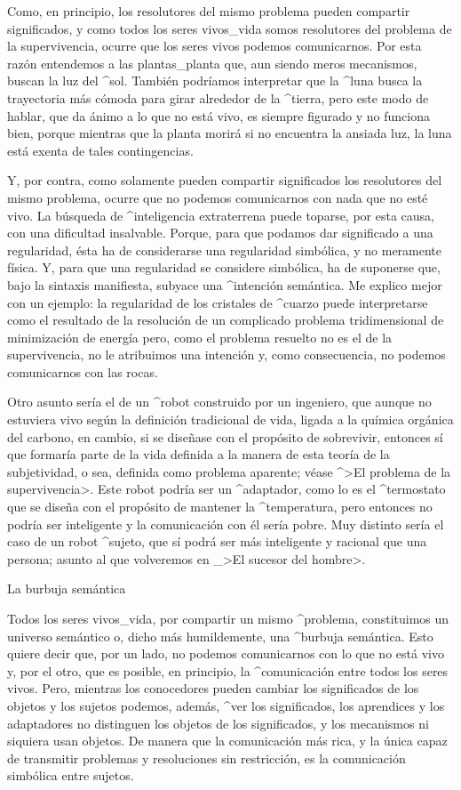 Como, en principio, los resolutores del mismo problema pueden compartir
significados, y como todos los seres vivos_{vida} somos resolutores del
problema de la supervivencia, ocurre que los seres vivos podemos
comunicarnos. Por esta razón entendemos a las plantas_{planta} que, aun
siendo meros mecanismos, buscan la luz del ^{sol}. También podríamos
interpretar que la ^{luna} busca la trayectoria más cómoda para girar
alrededor de la ^{tierra}, pero este modo de hablar, que da ánimo a lo
que no está vivo, es siempre figurado y no funciona bien, porque
mientras que la planta morirá si no encuentra la ansiada luz, la luna
está exenta de tales contingencias.


Y, por contra, como solamente pueden compartir significados los
resolutores del mismo problema, ocurre que no podemos comunicarnos con
nada que no esté vivo. La búsqueda de ^{inteligencia} extraterrena puede
toparse, por esta causa, con una dificultad insalvable. Porque, para que
podamos dar significado a una regularidad, ésta ha de considerarse una
regularidad simbólica, y no meramente física. Y, para que una
regularidad se considere simbólica, ha de suponerse que, bajo la
sintaxis manifiesta, subyace una ^{intención} semántica. Me explico
mejor con un ejemplo: la regularidad de los cristales de ^{cuarzo} puede
interpretarse como el resultado de la resolución de un complicado
problema tridimensional de minimización de energía pero, como el
problema resuelto no es el de la supervivencia, no le atribuimos una
intención y, como consecuencia, no podemos comunicarnos con las rocas.

Otro asunto sería el de un ^{robot} construido por un ingeniero, que
aunque no estuviera vivo según la definición tradicional de vida, ligada
a la química orgánica del carbono, en cambio, si se diseñase con el
propósito de sobrevivir, entonces sí que formaría parte de la vida
definida a la manera de esta teoría de la subjetividad, o sea, definida
como problema aparente; véase ^>El problema de la supervivencia>. Este
robot podría ser un ^{adaptador}, como lo es el ^{termostato} que se
diseña con el propósito de mantener la ^{temperatura}, pero entonces no
podría ser inteligente y la comunicación con él sería pobre. Muy
distinto sería el caso de un robot ^{sujeto}, que sí podrá ser más
inteligente y racional que una persona; asunto al que volveremos en _>El
sucesor del hombre>.


\Section La burbuja semántica

Todos los seres vivos_{vida}, por compartir un mismo ^{problema},
constituimos un universo semántico o, dicho más humildemente, una
^{burbuja semántica}. Esto quiere decir que, por un lado, no podemos
comunicarnos con lo que no está vivo y, por el otro, que es posible, en
principio, la ^{comunicación} entre todos los seres vivos. Pero,
mientras los conocedores pueden cambiar los significados de los objetos
y los sujetos podemos, además, ^{ver} los significados, los aprendices y
los adaptadores no distinguen los objetos de los significados, y los
mecanismos ni siquiera usan objetos. De manera que la comunicación más
rica, y la única capaz de transmitir problemas y resoluciones sin
restricción, es la comunicación simbólica entre sujetos.


